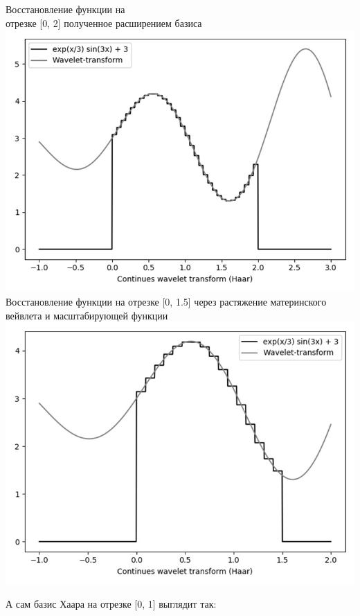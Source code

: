 \documentclass[a4paper]{article}
\begin{document}
	\begin{minipage}{0.45\textwidth}
		\begin{center}
			Восстановление функции на \\ отрезке [0, 2] полученное расширением базиса
			\includegraphics[scale=0.25]{./img2_2.jpg}
			Восстановление функции на отрезке [0, 1.5] через растяжение материнского вейвлета и масштабирующей функции
			\includegraphics[scale=0.25]{./img2_4.jpg}
		\end{center}
	\end{minipage}
	
	\newpage
	
	А сам базис Хаара на отрезке [0, 1] выглядит так:
	
\end{document}
